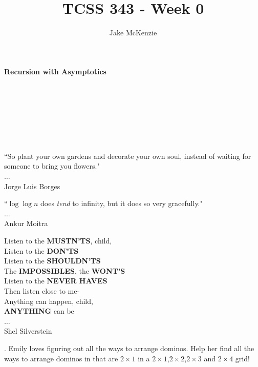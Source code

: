 \documentclass[12pt]{article}
\begin{document}
\title{TCSS 343 - Week 0}
\author{Jake McKenzie}
\maketitle
\noindent\centerline{\textbf{Recursion with Asymptotics}}\\\\\\\\\\\\
\begin{center}
    ``So plant your own gardens and decorate your own soul, instead of waiting for someone to bring you flowers." \\$\dots$\\ Jorge Luis Borges
\end{center}
\begin{center}
    ``$\log{\log{n}}$ does \textit{tend} to infinity, but it does so very gracefully." \\$\dots$\\ Ankur Moitra
\end{center}
\begin{center}
Listen to the \textbf{MUSTN'TS}, child,\\
      Listen to the \textbf{DON'TS}\\
      Listen to the \textbf{SHOULDN'TS}\\
The \textbf{IMPOSSIBLES}, the \textbf{WONT'S}\\
      Listen to the \textbf{NEVER HAVES}\\
Then listen close to me-\\
      Anything can happen, child,\\
      \textbf{ANYTHING} can be\\ 
      $\dots$\\
      Shel Silverstein 
\end{center}
    \newpage
{}. Emily loves figuring out all the ways to arrange dominos. Help her find all the ways to arrange dominos in that are $2 \times 1$ in a $2 \times 1$,$2 \times 2$,$2 \times 3$ and $2 \times 4$ grid!\\\\\\\\\\\\\\\\\\\\\\\\
\end{document}
